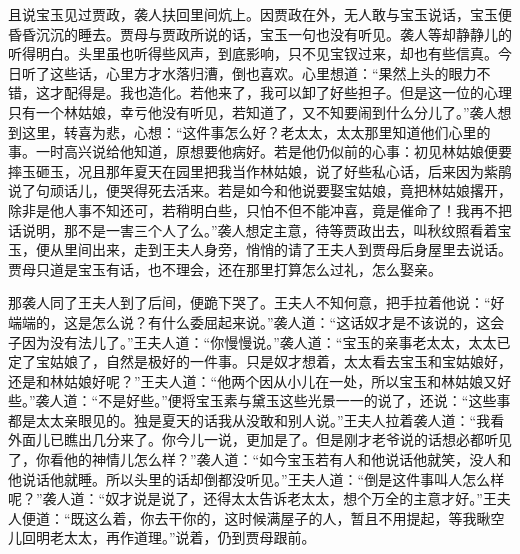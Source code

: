 \begin{parag}
    且说宝玉见过贾政，袭人扶回里间炕上。因贾政在外，无人敢与宝玉说话，宝玉便昏昏沉沉的睡去。贾母与贾政所说的话，宝玉一句也没有听见。袭人等却静静儿的听得明白。头里虽也听得些风声，到底影响，只不见宝钗过来，却也有些信真。今日听了这些话，心里方才水落归漕，倒也喜欢。心里想道：“果然上头的眼力不错，这才配得是。我也造化。若他来了，我可以卸了好些担子。但是这一位的心理只有一个林姑娘，幸亏他没有听见，若知道了，又不知要闹到什么分儿了。”袭人想到这里，转喜为悲，心想：“这件事怎么好？老太太，太太那里知道他们心里的事。一时高兴说给他知道，原想要他病好。若是他仍似前的心事：初见林姑娘便要摔玉砸玉，况且那年夏天在园里把我当作林姑娘，说了好些私心话，后来因为紫鹃说了句顽话儿，便哭得死去活来。若是如今和他说要娶宝姑娘，竟把林姑娘撂开，除非是他人事不知还可，若稍明白些，只怕不但不能冲喜，竟是催命了！我再不把话说明，那不是一害三个人了么。”袭人想定主意，待等贾政出去，叫秋纹照看着宝玉，便从里间出来，走到王夫人身旁，悄悄的请了王夫人到贾母后身屋里去说话。贾母只道是宝玉有话，也不理会，还在那里打算怎么过礼，怎么娶亲。
\end{parag}


\begin{parag}
    那袭人同了王夫人到了后间，便跪下哭了。王夫人不知何意，把手拉着他说：“好端端的，这是怎么说？有什么委屈起来说。”袭人道：“这话奴才是不该说的，这会子因为没有法儿了。”王夫人道：“你慢慢说。”袭人道：“宝玉的亲事老太太，太太已定了宝姑娘了，自然是极好的一件事。只是奴才想着，太太看去宝玉和宝姑娘好，还是和林姑娘好呢？”王夫人道：“他两个因从小儿在一处，所以宝玉和林姑娘又好些。”袭人道：“不是好些。”便将宝玉素与黛玉这些光景一一的说了，还说：“这些事都是太太亲眼见的。独是夏天的话我从没敢和别人说。”王夫人拉着袭人道：“我看外面儿已瞧出几分来了。你今儿一说，更加是了。但是刚才老爷说的话想必都听见了，你看他的神情儿怎么样？”袭人道：“如今宝玉若有人和他说话他就笑，没人和他说话他就睡。所以头里的话却倒都没听见。”王夫人道：“倒是这件事叫人怎么样呢？”袭人道：“奴才说是说了，还得太太告诉老太太，想个万全的主意才好。”王夫人便道：“既这么着，你去干你的，这时候满屋子的人，暂且不用提起，等我瞅空儿回明老太太，再作道理。”说着，仍到贾母跟前。
\end{parag}


